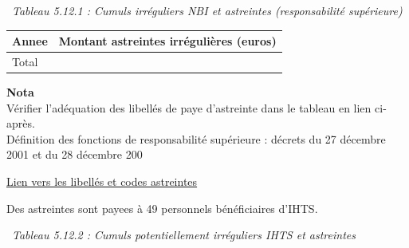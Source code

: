 ~\emph{Tableau 5.12.1 : Cumuls irréguliers NBI et astreintes
(responsabilité supérieure)}

\begin{longtable}[]{@{}ll@{}}
\toprule
Annee & Montant astreintes irrégulières (euros)\tabularnewline
\midrule
\endhead
Total &\tabularnewline
\bottomrule
\end{longtable}

\textbf{Nota}\\
Vérifier l'adéquation des libellés de paye d'astreinte dans le tableau
en lien ci-après.\\
Définition des fonctions de responsabilité supérieure : décrets du 27
décembre 2001 et du 28 décembre 200

\href{../Bases/Reglementation/libelles.astreintes.csv}{Lien vers les
libellés et codes astreintes}

Des astreintes sont payees à 49 personnels bénéficiaires d'IHTS.

~\emph{Tableau 5.12.2 : Cumuls potentiellement irréguliers IHTS et
astreintes}


